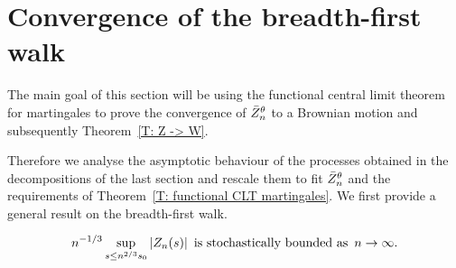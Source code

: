 \section{Convergence of the breadth-first walk}

The main goal of this section will be using the functional central limit theorem for martingales
to prove the convergence of $\bar{Z}^{\theta}_n$ to a Brownian motion and subsequently Theorem~\ref{T: Z -> W}.

Therefore we analyse the asymptotic behaviour of the processes obtained in the decompositions of the last section
and rescale them to fit $\bar{Z}^{\theta}_n$ and the requirements of Theorem~\ref{T: functional CLT martingales}.
We first provide a general result on the breadth-first walk.


\begin{lemma} \label{L: Zn stoch bounded}
	\begin{equation}
	n^{-1/3} \sup_{s \leq n^{2 / 3} s_0 } |Z_n(s)| 
	\enspace \text{is stochastically bounded as} \enspace n \rightarrow \infty.
	\end{equation}
\end{lemma}

